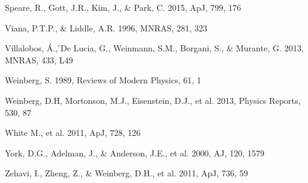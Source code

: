 \documentclass[iop]{emulateapj}
\begin{document}
\begin{thebibliography}{}
Speare, R., Gott, J.R., Kim, J., \& Park, C.
2015, ApJ, 799, 176



Viana, P.T.P., \& Liddle, A.R. 1996, MNRAS, 281, 323

Villalobos, \'{A}., ́De Lucia, G., Weinmann, S.M., Borgani, S., \& Murante, G. 2013, MNRAS, 433, L49


Weinberg, S. 1989, Reviews of Modern Physics, 61, 1

Weinberg, D.H, Mortonson, M.J., Eisenstein, D.J., et al. 2013, Physics Reports, 530, 87


White M., et al. 2011, ApJ, 728, 126

York, D.G., Adelman, J., \& Anderson, J.E., et al. 2000, AJ, 120, 1579

Zehavi, I., Zheng, Z., \& Weinberg, D.H., et al. 2011, ApJ, 736, 59




\end{thebibliography}
\end{document}
